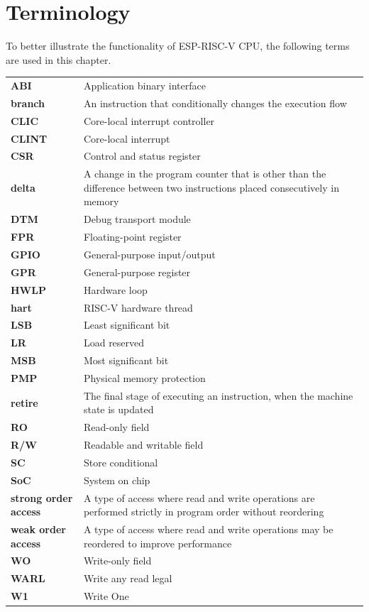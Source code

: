 \documentclass[main\_\_EN.tex]{subfiles}
\begin{document}
\section{Terminology}

To better illustrate the functionality of ESP-RISC-V CPU, the following terms are used in this chapter.

\begin{longtable}[c]{ R{2cm} p{12cm} }
\textbf{ABI} & Application binary interface\\
\textbf{branch} & An instruction that conditionally changes the execution flow \\
\textbf{CLIC} & Core-local interrupt controller\\
\textbf{CLINT} & Core-local interrupt\\
\textbf{CSR} & Control and status register\\
\textbf{delta} & A change in the program counter that is other than the difference between two instructions placed consecutively in memory \\
\textbf{DTM} & Debug transport module \\
\textbf{FPR} & Floating-point register\\
\textbf{GPIO} & General-purpose input/output\\
\textbf{GPR} & General-purpose register\\
\textbf{HWLP} & Hardware loop\\
\textbf{hart} & RISC-V hardware thread \\
\textbf{LSB} & Least significant bit\\
\textbf{LR} & Load reserved\\
\textbf{MSB} & Most significant bit\\
\textbf{PMP} & Physical memory protection\\
\textbf{retire} & The final stage of executing an instruction, when the machine state is updated \\
\textbf{RO} & Read-only field\\
\textbf{R/W} & Readable and writable field\\
\textbf{SC} & Store conditional\\
\textbf{SoC} & System on chip\\
\textbf{strong order access} & A type of access where read and write operations are performed strictly in program order without reordering \\
\textbf{weak order access} & A type of access where read and write operations may be reordered to improve performance \\
\textbf{WO} & Write-only field\\
\textbf{WARL} & Write any read legal\\
\textbf{W1} & Write One\\
\end{longtable}
\end{document}
